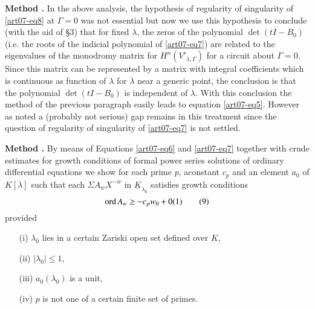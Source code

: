 \medskip
\noindent
{\bf Method .\label{art07-method1}}
In the above analysis, the hypothesis of regularity of singularity of \eqref{art07-eq8} at $\Gamma=0$ was not essential but now we use this hypothesis to conclude (with the aid of \S3) that for fixed $\lambda$, the zeros of the polynomial $\det(tI-B_{0})$ (i.e. the roots of the indicial polynomial of \eqref{art07-eq7}) are related to the eigenvalues of the monodromy matrix for $H^{n}(V'_{\lambda,\Gamma})$ for a circuit about $\Gamma=0$. Since this matrix can be represented by a matrix with integral coefficients which is continuous as function of $\lambda$ for $\lambda$ near a generic point, the conclusion is that the polynomial $\det (tI-B_{0})$ is independent of $\lambda$. With this conclusion the method of the previous paragraph easily leads to equation \eqref{art07-eq5}. However as noted a (probably not serious) gap remains in this treatment since the question of regularity of singularity of \eqref{art07-eq7} is not settled.

\medskip
\noindent
{\bf Method .\label{art07-method2}}
By means of Equations \eqref{art07-eq6} and \eqref{art07-eq7} together with crude estimates for growth conditions of formal power series solutions of ordinary differential equations we show for each prime $p$, a\pageoriginale constant $c_{p}$ and an element $a_{0}$ of $K[\lambda]$ such that each $\Sigma A_{w}X^{-w}$ in $\underline{K}_{\lambda_{0}}$ satisfies growth conditions
\begin{equation*}
\operatorname{\mathrm{ord}} A_{w}\geq -c_{p}w_{0}+0(1)\tag{9}\label{art07-eq9}
\end{equation*}
provided
\begin{itemize}
\item[(i)] $\lambda_{0}$ lies in a certain Zariski open set defined over $K$,

\item[(ii)] $|\lambda_{0}|\leq 1$,

\item[(iii)] $a_{0}(\lambda_{0})$ is a unit,

\item[(iv)] $p$ is not one of a certain finite set of primes.
\end{itemize}

